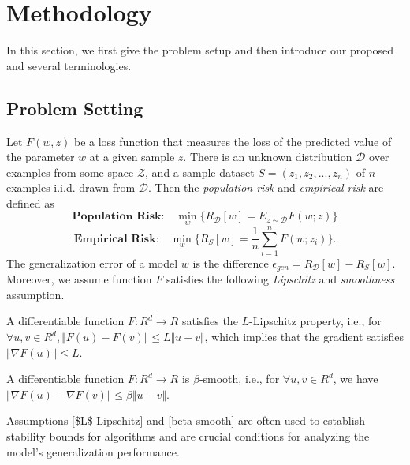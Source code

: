 \section{Methodology}
\label{sec:method}
In  this section, we first give the problem setup and then introduce our proposed \method{} and several terminologies.

\subsection{Problem Setting}
Let $F(w, z)$ be a loss function that measures the loss of the predicted value of the parameter $w$ at a given sample $z$. There is an unknown distribution $\mathcal{D}$ over examples from some space $\mathcal{Z}$, and a sample dataset $S=(z_1, z_2,..., z_n)$ of $n$ examples i.i.d. drawn from $\mathcal{D}$. Then the \emph{population risk} and \emph{empirical risk} are defined as 
\begin{equation}
\textbf{Population Risk:}\quad   \min_w \{R_\mathcal{D}[w]=E_ {z \sim \mathcal{D}}F(w; z) \} \label{prm}
\end{equation}
\begin{equation}
\textbf{Empirical Risk:}\quad  \min_w \{ R_S [w]= \frac{1}{n} \sum_{i=1}^{n}F(w; z_i) \}.\label{erm}
\end{equation}
 The generalization error of a model $w$ is the difference $\epsilon_{gen}=R_\mathcal{D}[w] - R_S [w]$. Moreover, we assume function $F$ satisfies the following \emph{Lipschitz} and \emph{smoothness} assumption.


\begin{assumption}[$L$-Lipschitz]
\label{$L$-Lipschitz}
A differentiable function $F: R^d \rightarrow R$ satisfies the $L$-Lipschitz property, i.e., for $\forall u, v \in R^d, \Vert F(u)-F(v)\Vert \leq L\Vert u-v\Vert$, which implies that the gradient satisfies $\Vert\nabla F(u)\Vert \leq L$.
\end{assumption}

\begin{assumption}
\label{beta-smooth}
A differentiable function $F: R^d \rightarrow R$ is $\beta$-smooth, i.e., for $\forall u, v \in R^d$, we have $\Vert\nabla F(u)-\nabla F(v)\Vert \leq \beta\Vert u-v\Vert$.%
\end{assumption}

Assumptions \ref{$L$-Lipschitz} and \ref{beta-smooth} are often used to establish stability bounds for algorithms and are crucial conditions for analyzing the model's generalization performance. 

